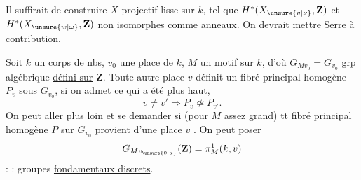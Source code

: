 Il suffirait de construire $X$ projectif lisse sur $k$, tel que
$H^*(X_{\unsure{v|\nu}},\mathbf Z)$ et $H^*(X_{\unsure{w|\omega}},\mathbf Z)$
non isomorphes comme \uline{anneaux}.
On devrait mettre Serre à contribution.

Soit $k$ un corps de nbs, $v_0$ une place de $k$, $M$ un motif sur $k$,
d’où $G_{Mv_0}=G_{v_0}$ grp algébrique \uline{défini sur} $\mathbf Z$.
Toute autre place  $v$ définit un fibré principal homogène
$P_v$ sous $G_{v_0}$,
 si on admet ce qui a été  plus haut,
\[
v\ne v'\Longrightarrow P_v\not\simeq P_{v'}.
\]
On peut aller plus loin et se demander si 
(pour $M$ assez grand) \uline{tt} fibré principal homogène $P$ sur $G_{v_0}$
provient d’une place $v$ .
 On  peut poser
\[
G_{Mv_{\unsure{0|a}}}(\mathbf Z)=\pi^1_M(k,v)
\]
 :   
 : groupes \uline{fondamentaux  discrets}.
